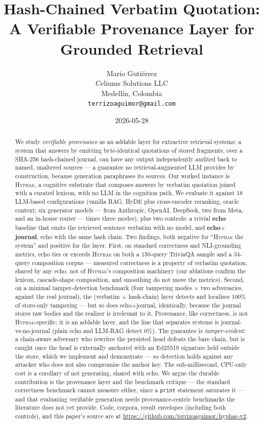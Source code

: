 \documentclass[11pt,letterpaper]{article}
\title{
    Hash-Chained Verbatim Quotation: \\
    A Verifiable Provenance Layer for Grounded Retrieval
}
\author{
    Mario Guti\'errez \\
    Celiums Solutions LLC \\
    Medell\'in, Colombia \\
    \texttt{terrizoaguimor@gmail.com}
}
\date{2026-05-28}
\newcommand{\hyphae}{\textsc{Hyphae}}
\begin{document}
\maketitle

\begin{abstract}
We study \emph{verifiable provenance} as an addable layer for
extractive retrieval systems: a system that answers by emitting
byte-identical quotations of stored fragments, over a SHA-256
hash-chained journal, can have any output independently audited
back to named, unaltered sources --- a guarantee no
retrieval-augmented LLM provides by construction, because
generation paraphrases its sources. Our worked instance is
\hyphae, a cognitive substrate that composes answers by verbatim
quotation joined with a curated lexicon, with no LLM in the
cognition path. We evaluate it against 18 LLM-based
configurations (vanilla RAG, HyDE plus cross-encoder reranking,
oracle context; six generator models --- from Anthropic, OpenAI,
DeepSeek, two from Meta, and an in-house router --- times three
modes), plus two controls: a trivial \textbf{echo} baseline that
emits the retrieved sentence verbatim with no model, and
\textbf{echo$+$journal}, echo with the same hash chain. Two
findings, both negative for ``\hyphae{} the system'' and positive
for the layer. First, on standard correctness and NLI-grounding
metrics, echo ties or exceeds \hyphae{} on both a 150-query
TriviaQA sample and a 34-query composition corpus --- measured
correctness is a property of verbatim quotation, shared by any
echo, not of \hyphae{}'s composition machinery (our ablations
confirm the lexicon, cascade-shape composition, and smoothing do
not move the metrics). Second, on a minimal tamper-detection
benchmark (four tampering modes $\times$ two adversaries, against
the real journal), the (verbatim $+$ hash-chain) layer detects and
localises 100\% of store-only tampering --- but so does
echo$+$journal, identically, because the journal stores raw bodies
and the realizer is irrelevant to it. Provenance, like
correctness, is not \hyphae{}-specific; it is an addable layer,
and the line that separates systems is journal-vs-no-journal
(plain echo and LLM-RAG detect 0\%). The guarantee is
\emph{tamper-evident}: a chain-aware adversary who rewrites the
persisted head defeats the bare chain, but is caught once the head
is externally anchored with an Ed25519 signature held outside the
store, which we implement and demonstrate --- so detection holds
against any attacker who does not also compromise the anchor key.
The sub-millisecond, CPU-only cost is a corollary of not
generating, shared with echo. We argue the durable contribution is the
provenance layer and the benchmark critique --- the standard
correctness benchmark cannot measure either, since a \texttt{print}
statement saturates it --- and that evaluating verifiable
generation needs provenance-centric benchmarks the literature does
not yet provide. Code, corpora, result envelopes (including both
controls), and this paper's source are at
\url{https://github.com/terrizoaguimor/hyphae-v2}.
\end{abstract}
\end{document}
